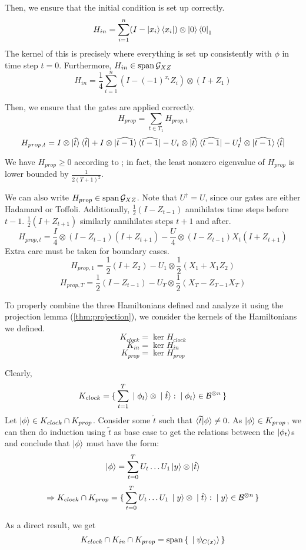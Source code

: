 	Then, we ensure that the initial condition is set up correctly.
	$$H_{in}=\sum_{i=1}^n(I-\ket{x_i}\bra{x_i})\otimes\ket{0}\bra{0}_1$$
	The kernel of this is precisely where everything is set up consistently with $\phi$ in time step $t=0$. Furthermore, $H_{in}\in\operatorname*{\operatorname{span}}\mathcal{G}_{XZ}$
	$$H_{in}=\frac{1}{4}\sum_{i=1}^n(I-(-1)^{x_i}Z_i)\otimes(I+Z_1)$$

	Then, we ensure that the gates are applied correctly.
	$$H_{prop}=\sum_{t\in T_1}H_{prop,t}$$
	$$H_{prop,t}=I\otimes\ket{\widehat{t}}\bra{\widehat{t}}
	+I\otimes\ket{\widehat{t-1}}\bra{\widehat{t-1}}
	-U_t\otimes\ket{\widehat{t}}\bra{\widehat{t-1}}
	-U_t^\dagger\otimes\ket{\widehat{t-1}}\bra{\widehat{t}}$$

	We have $H_{prop}\geq 0$ according to \cite{2002quant.ph.10077A}; in fact, the least nonzero eigenvalue of $H_{prop}$ is lower bounded by $\frac{1}{2(T+1)^2}$.

	We can also write $H_{prop}\in\operatorname*{\operatorname{span}}\mathcal{G}_{XZ}$. Note that $U^\dagger=U$, since our gates are either Hadamard or Toffoli.
	Additionally, $\frac{1}{2}(I-Z_{t-1})$ annihilates time steps before $t-1$. $\frac{1}{2}(I+Z_{t+1})$ similarly annihilates steps $t+1$ and after.
	$$H_{prop,t}=\frac{I}{4}\otimes(I-Z_{t-1})(I+Z_{t+1})-\frac{U}{4}\otimes(I-Z_{t-1})X_t(I+Z_{t+1})$$
	Extra care must be taken for boundary cases.
	$$H_{prop,1}=\frac{1}{2}(I+Z_2)-U_1\otimes\frac{1}{2}(X_1+X_1Z_2)$$
	$$H_{prop,T}=\frac{1}{2}(I-Z_{t-1})-U_T\otimes\frac{1}{2}(X_T-Z_{T-1}X_T)$$

	To properly combine the three Hamiltonians defined and analyze it using the projection lemma (\cref{thm:projection}), we consider the kernels of the Hamiltonians we defined.
	$$K_{clock}=\ker H_{clock}$$
	$$K_{in}=\ker H_{in}$$
	$$K_{prop}=\ker H_{prop}$$

	Clearly,
	$$K_{clock}=\set{\sum_{t=1}^T \ket{\phi_t}\otimes\ket{\hat{t}}:\ket{\phi_t}\in\mathcal{B}^{\otimes n}}$$
	Let $\ket\phi\in K_{clock}\cap K_{prop}$.
	Consider some $\widetilde{t}$ such that $\braket{\widetilde{t}|\phi}\ne0$.
	As $\ket\phi\in K_{prop}$, we can then do induction using $\widetilde{t}$ as base case to get the relations between the $\ket{\phi_t}$s and conclude that $\ket\phi$ must have the form:
	$$\ket\phi=\sum_{t=0}^TU_t\ldots U_1\ket{y}\otimes\ket{\hat{t}}$$
	$$\Rightarrow K_{clock}\cap K_{prop}=\set{\sum_{t=0}^TU_t\ldots U_1\ket{y}\otimes\ket{\hat{t}}: \ket{y}\in\mathcal{B}^{\otimes n}}$$

	As a direct result, we get
	$$K_{clock}\cap K_{in}\cap K_{prop}=\operatorname*{\operatorname{span}}\set{\ket{\psi_{C(x)}}}$$

